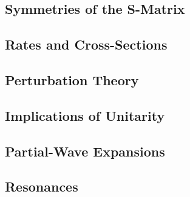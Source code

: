 \subsection{Symmetries of the S-Matrix}\label{susec:3_3}


\subsection{Rates and Cross-Sections}\label{susec:3_4}



\subsection{Perturbation Theory}\label{susec:3_5}



\subsection{Implications of Unitarity}\label{susec:3_6}



\subsection{Partial-Wave Expansions}\label{susec:3_7}



\subsection{Resonances}\label{susec:3_8}
